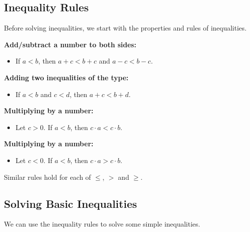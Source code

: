 
\subsection*{Inequality Rules}\label{sec:Inequalities}
Before solving inequalities, we start with the properties and rules of inequalities.\\

\begin{formulabox}
{\bf Add/subtract a number to both sides:}\vspace{-0.2cm}
\begin{itemize}
	\item If $a<b$, then $a+c<b+c$ and $a-c<b-c$.
\end{itemize}
{\bf Adding two inequalities of the  type:}\vspace{-0.2cm}
\begin{itemize}
	\item If $a<b$ and $c<d$, then $a+c<b+d$.\\
\end{itemize}
{\bf Multiplying by a  number:}\vspace{-0.2cm}
\begin{itemize}
	\item Let $c>0$. If $a<b$, then $c\cdot a<c\cdot b$.
\end{itemize}
{\bf Multiplying by a   number:}\vspace{-0.2cm}
\begin{itemize}
	\item Let $c<0$. If $a<b$, then $c\cdot a>c\cdot b$.\\
\end{itemize}
\end{formulabox}

Similar rules hold for each of $\leq$, $>$ and $\geq$.


\subsection*{Solving Basic Inequalities}
We can use the inequality rules to solve some simple inequalities. \\

